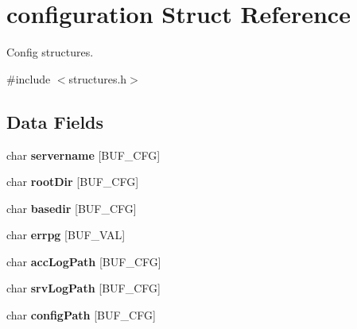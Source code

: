 \hypertarget{structconfiguration}{}\section{configuration Struct Reference}
\label{structconfiguration}


Config structures.  




{\ttfamily \#include $<$structures.\+h$>$}

\subsection*{Data Fields}
\begin{DoxyCompactItemize}
\item 
\hypertarget{structconfiguration_aed0c9b94a011cb078df1af99d48e7aab}{}char {\bfseries servername} \mbox{[}B\+U\+F\+\_\+\+C\+F\+G\mbox{]}\label{structconfiguration_aed0c9b94a011cb078df1af99d48e7aab}

\item 
\hypertarget{structconfiguration_ad2fe27c15863d4fd985c3b5a7359cbea}{}char {\bfseries root\+Dir} \mbox{[}B\+U\+F\+\_\+\+C\+F\+G\mbox{]}\label{structconfiguration_ad2fe27c15863d4fd985c3b5a7359cbea}

\item 
\hypertarget{structconfiguration_ab336961b40adfa019461b001394cbf9a}{}char {\bfseries basedir} \mbox{[}B\+U\+F\+\_\+\+C\+F\+G\mbox{]}\label{structconfiguration_ab336961b40adfa019461b001394cbf9a}

\item 
\hypertarget{structconfiguration_ac01dc1f952cba461c7137e1bfb1bb9f7}{}char {\bfseries errpg} \mbox{[}B\+U\+F\+\_\+\+V\+A\+L\mbox{]}\label{structconfiguration_ac01dc1f952cba461c7137e1bfb1bb9f7}

\item 
\hypertarget{structconfiguration_a409fd0fd4c8759d40ced464cefa2aff4}{}char {\bfseries acc\+Log\+Path} \mbox{[}B\+U\+F\+\_\+\+C\+F\+G\mbox{]}\label{structconfiguration_a409fd0fd4c8759d40ced464cefa2aff4}

\item 
\hypertarget{structconfiguration_a3e8dfae545709fcf1dc87d4de01d2593}{}char {\bfseries srv\+Log\+Path} \mbox{[}B\+U\+F\+\_\+\+C\+F\+G\mbox{]}\label{structconfiguration_a3e8dfae545709fcf1dc87d4de01d2593}

\item 
\hypertarget{structconfiguration_aca60e65b2ec0893583b42607fb319b27}{}char {\bfseries config\+Path} \mbox{[}B\+U\+F\+\_\+\+C\+F\+G\mbox{]}\label{structconfiguration_aca60e65b2ec0893583b42607fb319b27}


\end{DoxyCompactItemize}
